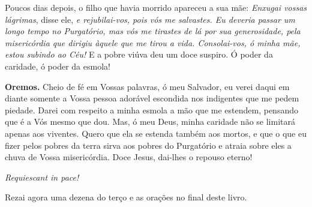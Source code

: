 Poucos dias depois, o filho que havia morrido apareceu a sua mãe: \textit{Enxugai vossas lágrimas}, disse ele, \textit{e rejubilai-vos, pois vós me salvastes. Eu deveria passar um longo tempo no Purgatório, mas vós me tirastes de lá por sua generosidade, pela misericórdia que dirigiu àquele que me tirou a vida. Consolai-vos, ó minha mãe, estou subindo ao Céu!} E a pobre viúva deu um doce suspiro. Ó poder da caridade, ó poder da esmola!


\vspace{\baselineskip}\noindent \textbf{Oremos.} Cheio de fé em Vossas palavras, ó meu Salvador, eu verei daqui em diante somente a Vossa pessoa adorável escondida nos indigentes que me pedem piedade. Darei com respeito a minha esmola a mão que me estendem, pensando que é a Vós mesmo que dou. Mas, ó meu Deus, minha caridade não se limitará apenas aos viventes. Quero que ela se estenda também aos mortos, e que o que eu fizer pelos pobres da terra sirva aos pobres do Purgatório e atraia sobre eles a chuva de Vossa misericórdia. Doce Jesus, dai-lhes o repouso eterno!


\begin{center}
\textit{Requiescant in pace!}
\end{center}

Rezai agora uma dezena do terço e as orações no final deste livro.
